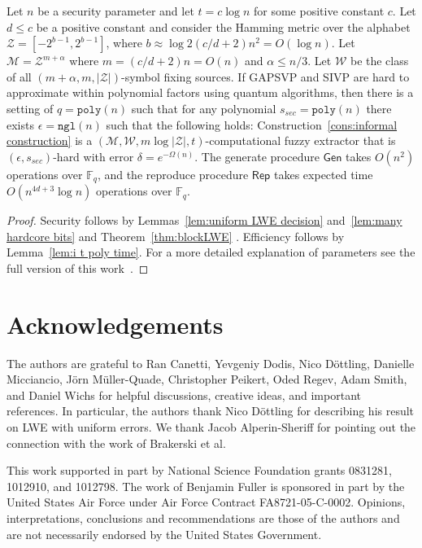 \documentclass{llncs}
\newcommand{\thref}[1]{\mbox{Theorem~\ref{#1}}}
\newcommand{\lemref}[1]{\mbox{Lemma~\ref{#1}}}
\newcommand{\consref}[1]{\mbox{Construction~\ref{#1}}}
\newcommand{\class}[1]{{\ensuremath{\mathsf{#1}}}}
\newcommand{\gen}{\ensuremath{\class{Gen}}\xspace}
\newcommand{\rep}{\ensuremath{\class{Rep}}\xspace}
\newcommand{\Fq}{\ensuremath{\mathbb{F}_q}}
\newcommand{\poly}{\ensuremath{\mathtt{poly}}\xspace}
\newcommand{\ngl}{\ensuremath{\mathtt{ngl}}\xspace}
\newcommand{\M}{\mathcal{M}}
\begin{document}
\begin{theorem}
\label{thm:lossless block sketch log}
Let $n$ be a security parameter and let $t = c\log n$ for some positive constant $c$.  Let $d\le c$ be a positive constant and consider the Hamming metric over the alphabet $\mathcal{Z}=[-2^{b-1},2^{b-1}]$, where $b \approx \log 2(c/d+2)n^2 = O(\log n)$.  Let $\mathcal{M} = \mathcal{Z}^{m+\alpha}$ where $m= (c/d+2)n=O(n)$ and $\alpha \leq n/3$. 
Let $\mathcal{W}$ be the class of all $(m+\alpha, m, |\mathcal{Z}|)$-symbol fixing sources.  If GAPSVP and SIVP are hard to approximate within polynomial factors 
using quantum algorithms, then  there is a setting of $q = \poly(n)$ such that for any polynomial $s_{sec} = \poly(n)$
 there exists $\epsilon = \ngl(n)$ 
such that the following holds: \consref{cons:informal construction} is a $(\M, \mathcal{W}, m\log |\mathcal{Z}|, t)$-computational fuzzy extractor that is $(\epsilon, s_{sec})$-hard with error $\delta = e^{-\Omega(n)}$.
 The generate procedure $\gen$ takes $O(n^2)$ operations over $\Fq$, and the reproduce procedure $\rep$ takes expected time $O(n^{4d+3} \log n)$ operations over $\Fq$.
\end{theorem}

\begin{proof} Security follows by Lemmas~\ref{lem:uniform LWE decision} and~\ref{lem:many hardcore bits} and  \thref{thm:blockLWE} .  
Efficiency follows by \lemref{lem:i t poly time}.  For a more detailed explanation of parameters see the full version of this work~\cite{fullerMengReyzin2013}.
\end{proof}

\section*{Acknowledgements}
The authors are grateful to Ran Canetti, Yevgeniy Dodis, Nico D\"{o}ttling, Danielle Micciancio, J\"{o}rn M\"{u}ller-Quade, Christopher Peikert, Oded Regev, Adam Smith, and Daniel Wichs for helpful discussions, creative ideas, and important references.  In particular, the authors thank Nico D\"{o}ttling for describing his result on LWE with uniform errors.  We thank Jacob Alperin-Sheriff for pointing out the connection with the work of Brakerski et al. 

This work supported in part by National Science Foundation grants 0831281, 1012910, and 1012798. The work of Benjamin Fuller is sponsored in part by the United States Air Force under Air Force Contract FA8721-05-C-0002. Opinions, interpretations, conclusions and recommendations are those of the authors and are not necessarily endorsed by the United States Government.  


\appendix
\end{document}

